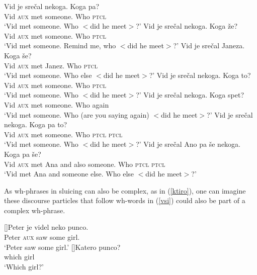 \documentclass[output=paper,
modfonts,
newtxmath,
hidelinks
]{langscibook}
\begin{document}
\begin{exe}
\ex\label{vsi}
\begin{xlist}
 \ex 
 \gll Vid je srečal nekoga. Koga pa? \\
 Vid \textsc{aux} met someone. Who \textsc{ptcl} \\
 \trans `Vid met someone. Who $<$did he meet$>$?'
 \ex	
 \gll Vid je srečal nekoga. Koga že?\\
	 Vid \textsc{aux} met someone. Who \textsc{ptcl} \\
 \trans	`Vid met someone. Remind me, who $<$did he meet$>$?'
  \ex	
 \gll 	Vid je srečal Janeza. Koga še?\\
		Vid \textsc{aux} met Janez. Who \textsc{ptcl} \\
 \trans	`Vid met someone. Who else $<$did he meet$>$?'
 \ex	
 \gll 	Vid je srečal nekoga. Koga to?\\
		Vid \textsc{aux} met someone. Who \textsc{ptcl} \\
 \trans	`Vid met someone. Who $<$did he meet$>$?'
 \ex	
 \gll 	Vid je srečal nekoga. Koga spet?\\
		Vid \textsc{aux} met someone. Who again\\
 \trans	`Vid met someone. Who (are you saying again) $<$did he meet$>$?'
 \ex	
 \gll Vid je srečal nekoga. Koga pa to?\\
		Vid \textsc{aux} met someone. Who  \textsc{ptcl}  \textsc{ptcl}  \\
 \trans	`Vid met someone. Who $<$did he meet$>$?'
 \ex 
 \gll	Vid je srečal Ano pa še nekoga.  Koga pa še?\\
		Vid \textsc{aux} met Ana and also someone. Who \textsc{ptcl}  \textsc{ptcl} \\
 \trans	 `Vid met Ana and someone else. Who else $<$did he meet$>$?'
 \end{xlist}
\end{exe}

\noindent As wh-phrases in sluicing can also be complex, as in (\ref{ktiro}), one can imagine these discourse particles that follow wh-words in (\ref{vsi}) could also be part of a complex wh-phrase. 

\begin{exe}
 \ex\label{ktiro}
 \begin{xlist}
 []{\gll Peter je videl neko punco.\\
	Peter \textsc{aux} saw some girl.\\
    \trans `Peter saw some girl.'}
  []{\gll Katero punco?\\
  which girl\\
 \trans `Which girl?'}
 \end{xlist}
\end{exe}
\end{document}
